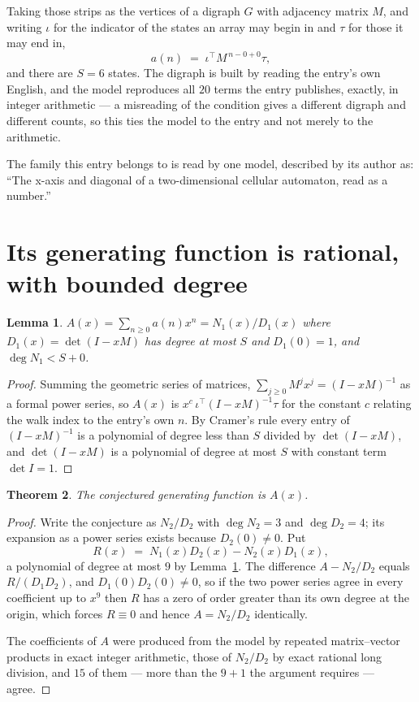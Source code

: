 \documentclass[11pt,a4paper]{article}
\theoremstyle{plain}
\newtheorem{theorem}{Theorem}
\newtheorem{lemma}[theorem]{Lemma}
\theoremstyle{definition}
\begin{document}
Taking those strips as the vertices of a digraph $G$ with adjacency matrix $M$, and writing
$\iota$ for the indicator of the states an array may begin in and $\tau$ for those it may end
in,
\[
a(n)\;=\;\iota^{\!\top}M^{\,n-0+0}\tau ,
\]
and there are $S=6$ states. The digraph is built by reading the entry's own English, and the
model reproduces all $20$ terms the entry publishes, exactly, in integer arithmetic --- a
misreading of the condition gives a different digraph and different counts, so this ties the
model to the entry and not merely to the arithmetic.

The family this entry belongs to is read by one model, described by its author as: ``The x-axis and diagonal of a two-dimensional cellular automaton, read as a number.''


\section{Its generating function is rational, with bounded degree}

\begin{lemma}\label{lem:rat}
$A(x)=\sum_{n\ge0}a(n)x^n=N_1(x)/D_1(x)$ where $D_1(x)=\det(I-xM)$ has degree at most
$S$ and $D_1(0)=1$, and $\deg N_1<S+0$.
\end{lemma}

\begin{proof}
Summing the geometric series of matrices, $\sum_{j\ge0}M^jx^j=(I-xM)^{-1}$ as a formal
power series, so $A(x)$ is $x^{c}\,\iota^{\!\top}(I-xM)^{-1}\tau$ for the constant $c$
relating the walk index to the entry's own $n$. By Cramer's rule every entry of
$(I-xM)^{-1}$ is a polynomial of degree less than $S$ divided by $\det(I-xM)$, and
$\det(I-xM)$ is a polynomial of degree at most $S$ with constant term $\det I=1$.
\end{proof}

\begin{theorem}
The conjectured generating function is $A(x)$.
\end{theorem}

\begin{proof}
Write the conjecture as $N_2/D_2$ with $\deg N_2=3$ and $\deg D_2=4$; its expansion as a
power series exists because $D_2(0)\neq0$. Put
\[
R(x)\;=\;N_1(x)D_2(x)-N_2(x)D_1(x),
\]
a polynomial of degree at most $9$ by Lemma~\ref{lem:rat}. The difference
$A-N_2/D_2$ equals $R/(D_1D_2)$, and $D_1(0)D_2(0)\neq0$, so if the two power series agree in
every coefficient up to $x^{9}$ then $R$ has a zero of order greater than its own
degree at the origin, which forces $R\equiv0$ and hence $A=N_2/D_2$ identically.

The coefficients of $A$ were produced from the model by repeated matrix--vector products in
exact integer arithmetic, those of $N_2/D_2$ by exact rational long division, and $15$
of them --- more than the $9+1$ the argument requires --- agree.
\end{proof}
\end{document}
